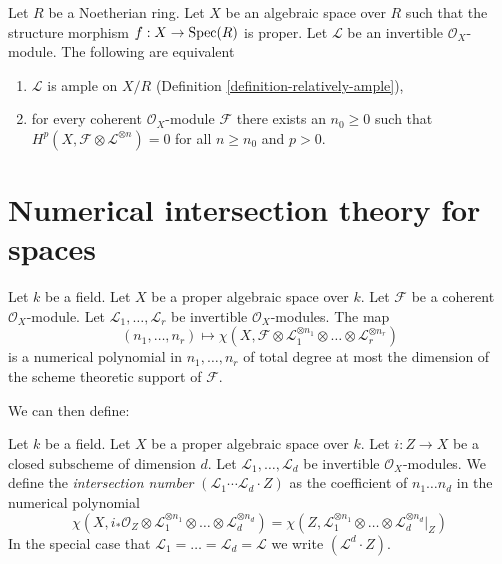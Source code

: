 \begin{lemma}
Let $R$ be a Noetherian ring. Let $X$ be an algebraic space over $R$
such that the structure morphism $f : X \to \mathop{\rm Spec}(R)$ is proper.
Let $\mathcal{L}$ be an invertible $\mathcal{O}_X$-module.
The following are equivalent
\begin{enumerate}
\item $\mathcal{L}$ is ample on $X/R$
(Definition \ref{definition-relatively-ample}),
\item for every coherent $\mathcal{O}_X$-module $\mathcal{F}$
there exists an $n_0 \geq 0$ such that
$H^p(X, \mathcal{F} \otimes \mathcal{L}^{\otimes n}) = 0$
for all $n \geq n_0$ and $p > 0$.
\end{enumerate}
\end{lemma}

\section{Numerical intersection theory for spaces}
\begin{lemma}\label{tag:0DN4}
Let $k$ be a field. Let $X$ be a proper algebraic space over $k$.
Let $\mathcal{F}$ be a coherent $\mathcal{O}_X$-module. Let
$\mathcal{L}_1, \ldots, \mathcal{L}_r$ be invertible $\mathcal{O}_X$-modules.
The map
$$
(n_1, \ldots, n_r) \longmapsto
\chi(X, \mathcal{F} \otimes
\mathcal{L}_1^{\otimes n_1} \otimes \ldots \otimes
\mathcal{L}_r^{\otimes n_r})
$$
is a numerical polynomial in $n_1, \ldots, n_r$ of total degree at
most the dimension of the scheme theoretic support of $\mathcal{F}$.
\end{lemma}
We can then define:
\begin{definition}\label{tag:0BEP}
Let $k$ be a field. Let $X$ be a proper algebraic space over $k$. Let
$i : Z \to X$ be a closed subscheme of dimension $d$. Let
$\mathcal{L}_1, \ldots, \mathcal{L}_d$ be invertible
$\mathcal{O}_X$-modules. We define the {\it intersection number}
$(\mathcal{L}_1 \cdots \mathcal{L}_d \cdot Z)$
as the coefficient of $n_1 \ldots n_d$ in the numerical polynomial
$$
\chi(X, i_*\mathcal{O}_Z \otimes \mathcal{L}_1^{\otimes n_1} \otimes
\ldots \otimes \mathcal{L}_d^{\otimes n_d}) =
\chi(Z, \mathcal{L}_1^{\otimes n_1} \otimes
\ldots \otimes \mathcal{L}_d^{\otimes n_d}|_Z)
$$
In the special
case that $\mathcal{L}_1 = \ldots = \mathcal{L}_d = \mathcal{L}$
we write $(\mathcal{L}^d \cdot Z)$.
\end{definition}







